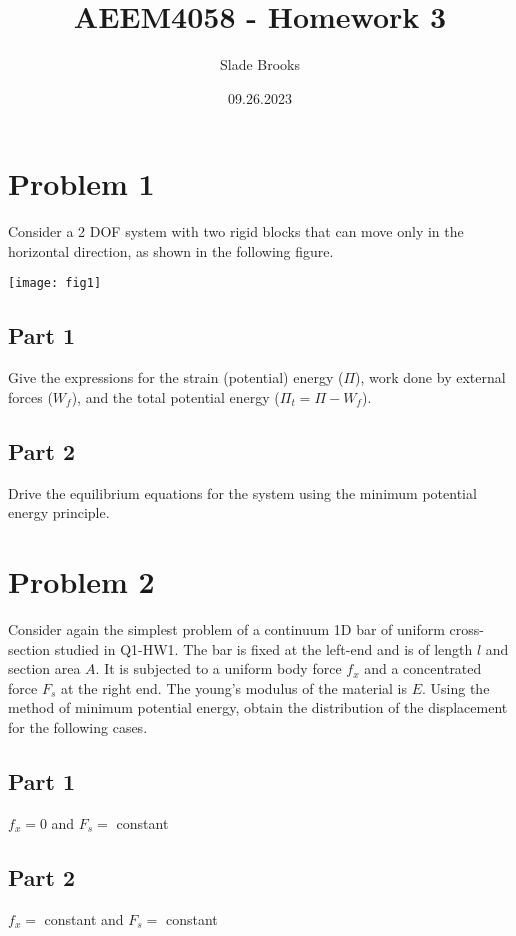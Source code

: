 \documentclass{article}
\title{AEEM4058 - Homework 3}
\author{Slade Brooks}
\date{09.26.2023}
\begin{document}
\maketitle

\section*{Problem 1}
Consider a 2 DOF system with two rigid blocks that can move only in the horizontal direction, as shown in
the following figure.
\begin{center}
    \texttt{[image: fig1]}
\end{center}

\subsection*{Part 1}
Give the expressions for the strain (potential) energy ($\Pi$), work done by external forces ($W_f$), and the
total potential energy ($\Pi_t=\Pi-W_f$).

\subsection*{Part 2}
Drive the equilibrium equations for the system using the minimum potential energy principle.

\section*{Problem 2}
Consider again the simplest problem of a continuum 1D bar of uniform cross-section studied in Q1-HW1.
The bar is fixed at the left-end and is of length $l$ and section area $A$. It is subjected to a uniform body
force $f_x$ and a concentrated force $F_s$ at the right end. The young’s modulus of the material is $E$. Using
the method of minimum potential energy, obtain the distribution of the displacement for the following cases.

\subsection*{Part 1}
$f_x=0$ and $F_s=$ constant

\subsection*{Part 2}
$f_x=$ constant and $F_s=$ constant
\end{document}
